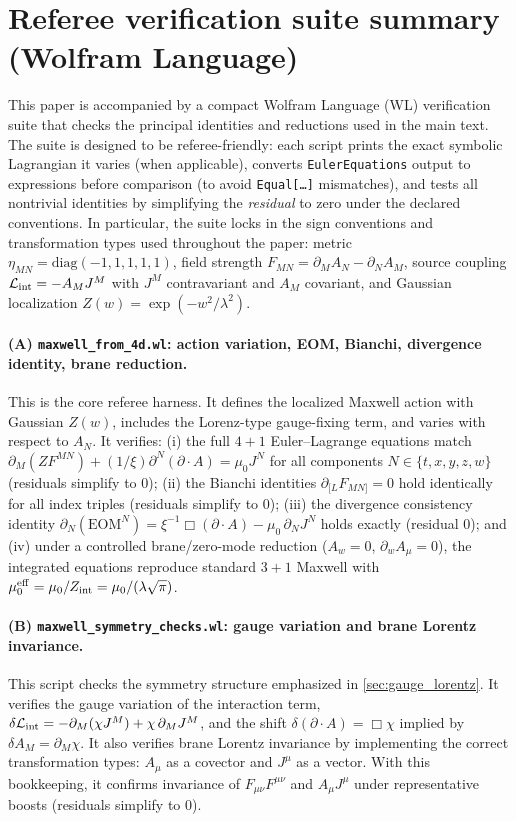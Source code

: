 \documentclass[11pt]{article}
\newcommand{\A}{A}
\newcommand{\F}{F}
\newcommand{\J}{J}
\newcommand{\Z}{Z}
\newcommand{\lam}{\lambda}      %
\newcommand{\Zint}{Z_{\rm int}} %
\newcommand{\muo}{\mu_0}
\newcommand{\mueff}{\mu_0^{\rm eff}}
\newcommand{\xigf}{\xi}
\begin{document}
\section{Referee verification suite summary (Wolfram Language)}
\label{app:wl_suite}

This paper is accompanied by a compact Wolfram Language (WL) verification suite
that checks the principal identities and reductions used in the main text. The
suite is designed to be referee-friendly: each script prints the exact symbolic
Lagrangian it varies (when applicable), converts \texttt{EulerEquations} output to
expressions before comparison (to avoid \texttt{Equal[\dots]} mismatches), and
tests all nontrivial identities by simplifying the \emph{residual} to zero under
the declared conventions. In particular, the suite locks in the sign conventions
and transformation types used throughout the paper: metric
\(\eta_{MN}=\mathrm{diag}(-1,1,1,1,1)\), field strength
\(\F_{MN}=\partial_M\A_N-\partial_N\A_M\), source coupling
\(\mathcal L_{\rm int}=-\A_M\J^M\) with \(\J^M\) contravariant and \(\A_M\)
covariant, and Gaussian localization \(\Z(w)=\exp(-w^2/\lam^2)\).

\paragraph{(A) \texttt{maxwell\_from\_4d.wl}: action variation, EOM, Bianchi, divergence identity, brane reduction.}
This is the core referee harness. It defines the localized Maxwell action with
Gaussian \(\Z(w)\), includes the Lorenz-type gauge-fixing term, and varies with
respect to \(\A_N\). It verifies:
(i) the full \(4+1\) Euler--Lagrange equations match
\(\partial_M(\Z\F^{MN})+(1/\xigf)\partial^N(\partial\!\cdot\!\A)=\muo\J^N\) for all
components \(N\in\{t,x,y,z,w\}\) (residuals simplify to \(0\));
(ii) the Bianchi identities \(\partial_{[L}\F_{MN]}=0\) hold identically for all
index triples (residuals simplify to \(0\));
(iii) the divergence consistency identity
\(\partial_N(\mathrm{EOM}^N)=\xigf^{-1}\Box(\partial\!\cdot\!\A)-\muo\,\partial_N\J^N\)
holds exactly (residual \(0\));
and (iv) under a controlled brane/zero-mode reduction (\(\A_w=0\),
\(\partial_w\A_\mu=0\)), the integrated equations reproduce standard \(3+1\)
Maxwell with \(\mueff=\muo/\Zint=\muo/(\lam\sqrt{\pi})\).

\paragraph{(B) \texttt{maxwell\_symmetry\_checks.wl}: gauge variation and brane Lorentz invariance.}
This script checks the symmetry structure emphasized in
\cref{sec:gauge_lorentz}. It verifies the gauge variation of the interaction term,
\(\delta\mathcal L_{\rm int}=-\partial_M(\chi\J^M)+\chi\,\partial_M\J^M\), and the
shift \(\delta(\partial\!\cdot\!\A)=\Box\chi\) implied by \(\delta \A_M=\partial_M\chi\).
It also verifies brane Lorentz invariance by implementing the correct
transformation types: \(\A_\mu\) as a covector and \(\J^\mu\) as a vector. With
this bookkeeping, it confirms invariance of \(\F_{\mu\nu}\F^{\mu\nu}\) and
\(\A_\mu\J^\mu\) under representative boosts (residuals simplify to \(0\)).
\end{document}
